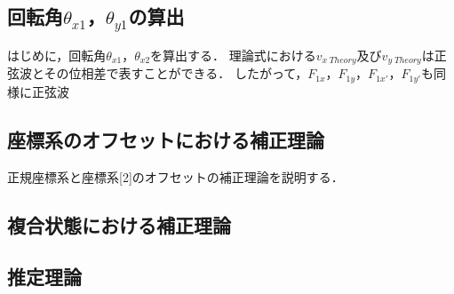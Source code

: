 \subsection{回転角$\theta_{x1}$，$\theta_{y1}$の算出}
はじめに，回転角$\theta_{x1}$，$\theta_{x2}$を算出する．
理論式における$v_{x\;Theory}$及び$v_{y\;Theory}$は正弦波とその位相差で表すことができる．
したがって，$F_{1x}$，$F_{1y}$，$F_{1x'}$，$F_{1y'}$も同様に正弦波

\newpage

\subsection{座標系のオフセットにおける補正理論}

正規座標系と座標系[2]のオフセットの補正理論を説明する．


\subsection{複合状態における補正理論}

\subsection{推定理論}